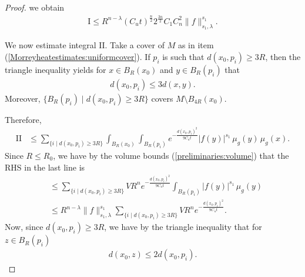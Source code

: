 \documentclass[12pt]{amsart}
\renewcommand{\1}{{\mathbf 1}}
\theoremstyle{others}
\numberwithin{equation}{section}
\begin{document}
\begin{proof}
   we obtain \begin{align}\label{Morreyheatestimates:I}
       \text{I} \leq R^{n-\lambda} (C_u t)^{\frac{n}{2}} 2^{\frac{3n}{2}} C_1 C_n^2 \|f\|_{s_1, \lambda}^{s_1}.
   \end{align} \par
   We now estimate integral \(\text{II}\).  Take a cover of \(M\) as in item (\ref{Morreyheatestimates:uniformcover}). If \(p_i\) is such that \(d(x_0, p_i) \geq 3R\), then the triangle inequality yields for \(x \in B_R(x_0)\) and \(y \in B_R(p_i)\) that
   \begin{align*}
       d(x_0, p_i) \leq 3d(x, y).
   \end{align*} Moreover, \(\{B_R(p_i) \mid d(x_0, p_i) \geq 3R\}\) covers \(M \setminus B_{4R}(x_0)\). 

   Therefore,
   \begin{align*}
       \text{II} &\leq \sum_{\{i \mid d(x_0, p_i) \geq 3R\}} \int_{B_R(x_0)} \int_{B_R(p_i)} e^{-\frac{d(x_0, p_i)^2}{9C_ut}} |f(y)|^{s_1} \, \mu_g(y) \, \mu_g(x).
    \end{align*} Since \(R \leq R_0\), we have by the volume bounds (\ref{preliminaries:volume}) that the RHS in the last line is
    \begin{align*}
        &\leq \sum_{\{i \mid d(x_0, p_i) \geq 3R\}} VR^ne^{-\frac{d(x_0, p_i)^2}{9C_ut}} \int_{B_R(p_i)} |f(y)|^{s_1} \, \mu_g(y) \\
        &\leq R^{n-\lambda}\|f\|_{s_1, \lambda}^{s_1} \sum_{\{i \mid d(x_0, p_i) \geq 3R\}} VR^ne^{-\frac{d(x_0, p_i)^2}{9C_ut}}.
   \end{align*} Now, since \(d(x_0, p_i) \geq 3R\), we have by the triangle inequality that for \(z \in B_R(p_i)\)
   \begin{align*}
       d(x_0, z) \leq 2d(x_0, p_i).
   \end{align*}

\end{proof}
\end{document}
